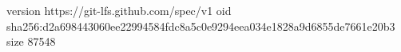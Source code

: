 version https://git-lfs.github.com/spec/v1
oid sha256:d2a698443060ee22994584fdc8a5c0e9294eea034e1828a9d6855de7661e20b3
size 87548
